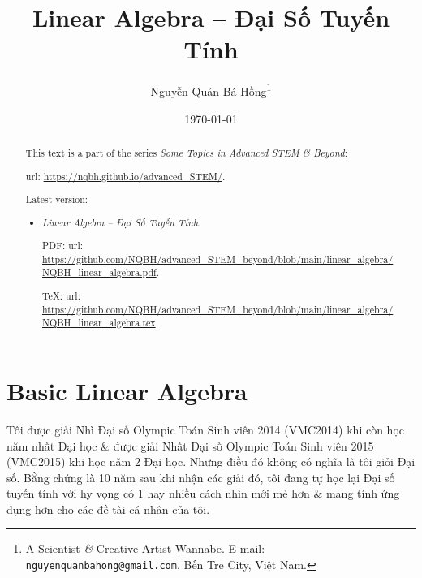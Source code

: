 \documentclass{article}
\title{Linear Algebra -- Đại Số Tuyến Tính}
\author{Nguyễn Quản Bá Hồng\footnote{A Scientist {\it\&} Creative Artist Wannabe. E-mail: {\tt nguyenquanbahong@gmail.com}. Bến Tre City, Việt Nam.}}
\date{\today}
\begin{document}
\maketitle
\begin{abstract}
	This text is a part of the series {\it Some Topics in Advanced STEM \& Beyond}:
	
	{\sc url}: \url{https://nqbh.github.io/advanced_STEM/}.
	
	Latest version:
	\begin{itemize}
		\item {\it Linear Algebra -- Đại Số Tuyến Tính}.
		
		PDF: {\sc url}: \url{https://github.com/NQBH/advanced_STEM_beyond/blob/main/linear_algebra/NQBH_linear_algebra.pdf}.
		
		\TeX: {\sc url}: \url{https://github.com/NQBH/advanced_STEM_beyond/blob/main/linear_algebra/NQBH_linear_algebra.tex}.
	\end{itemize}
\end{abstract}
\tableofcontents


\section{Basic Linear Algebra}
Tôi được giải Nhì Đại số Olympic Toán Sinh viên 2014 (VMC2014) khi còn học năm nhất Đại học \& được giải Nhất Đại số Olympic Toán Sinh viên 2015 (VMC2015) khi học năm 2 Đại học. Nhưng điều đó không có nghĩa là tôi giỏi Đại số. Bằng chứng là 10 năm sau khi nhận các giải đó, tôi đang tự học lại Đại số tuyến tính với hy vọng có 1 hay nhiều cách nhìn mới mẻ hơn \& mang tính ứng dụng hơn cho các đề tài cá nhân của tôi.
\end{document}
